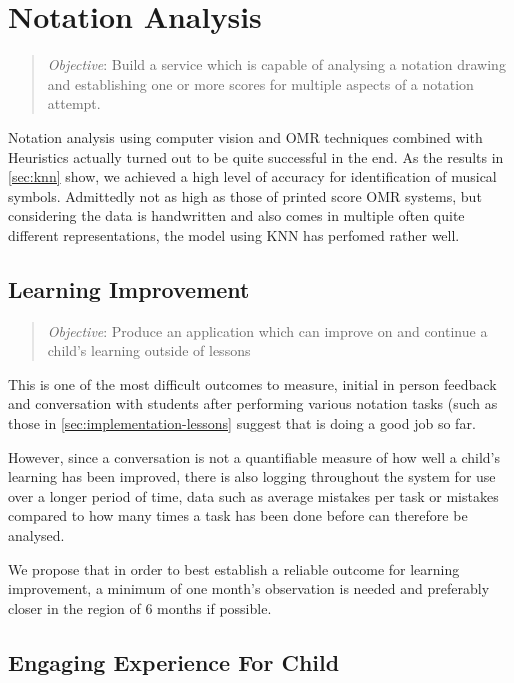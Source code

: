 \section{Notation Analysis}

\begin{quotation}
\emph{Objective}: Build a service which is capable of analysing a notation drawing and establishing one or more scores for multiple aspects of a notation attempt.
\end{quotation}

Notation analysis using computer vision and OMR techniques combined with Heuristics actually turned out to be quite successful in the end. As the results in \cref{sec:knn} show, we achieved a high level of accuracy for identification of musical symbols. Admittedly not as high as those of printed score OMR systems, but considering the data is handwritten and also comes in multiple often quite different representations, the model using KNN has perfomed rather well.

\subsection{Learning Improvement}

\begin{quotation}
\emph{Objective}: Produce an application which can improve on and continue a child's learning outside of lessons
\end{quotation}

This is one of the most difficult outcomes to measure, initial in person feedback and conversation with students after performing various notation tasks (such as those in \cref{sec:implementation-lessons} suggest that \noteED is doing a good job so far.

However, since a conversation is not a quantifiable measure of how well a child's learning has been improved, there is also logging throughout the system for use over a longer period of time, data such as average mistakes per task or mistakes compared to how many times a task has been done before can therefore be analysed. 

We propose that in order to best establish a reliable outcome for learning improvement, a minimum of one month's observation is needed and preferably closer in the region of 6 months if possible.

\subsection{Engaging Experience For Child}

